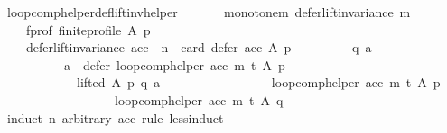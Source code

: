 \begin{isabellebody}
%
\isadelimproof
%
\endisadelimproof
%
\isadelimdocument
%
\endisadelimdocument
%
\isatagdocument
%
\isamarkuptrue%
%
\endisatagdocument
{\isafolddocument}%
%
\isadelimdocument
%
\endisadelimdocument
{}\isamarkupfalse%
\ loop{\isacharunderscore}{\kern0pt}comp{\isacharunderscore}{\kern0pt}helper{\isacharunderscore}{\kern0pt}def{\isacharunderscore}{\kern0pt}lift{\isacharunderscore}{\kern0pt}inv{\isacharunderscore}{\kern0pt}helper{\isacharcolon}{\kern0pt}\isanewline
\ \ \isanewline
\ \ \ \ monotone{\isacharunderscore}{\kern0pt}m{\isacharcolon}{\kern0pt}\ {\isachardoublequoteopen}defer{\isacharunderscore}{\kern0pt}lift{\isacharunderscore}{\kern0pt}invariance\ m{\isachardoublequoteclose}\ \isanewline
\ \ \ \ f{\isacharunderscore}{\kern0pt}prof{\isacharcolon}{\kern0pt}\ {\isachardoublequoteopen}finite{\isacharunderscore}{\kern0pt}profile\ A\ p{\isachardoublequoteclose}\isanewline
\ \ \isanewline
\ \ \ \ {\isachardoublequoteopen}{\isacharparenleft}{\kern0pt}defer{\isacharunderscore}{\kern0pt}lift{\isacharunderscore}{\kern0pt}invariance\ acc\ {\isasymand}\ n\ {\isacharequal}{\kern0pt}\ card\ {\isacharparenleft}{\kern0pt}defer\ acc\ A\ p{\isacharparenright}{\kern0pt}{\isacharparenright}{\kern0pt}\ {\isasymlongrightarrow}\isanewline
\ \ \ \ \ \ \ \ {\isacharparenleft}{\kern0pt}{\isasymforall}q\ a{\isachardot}{\kern0pt}\isanewline
\ \ \ \ \ \ \ \ \ \ {\isacharparenleft}{\kern0pt}a\ {\isasymin}\ {\isacharparenleft}{\kern0pt}defer\ {\isacharparenleft}{\kern0pt}loop{\isacharunderscore}{\kern0pt}comp{\isacharunderscore}{\kern0pt}helper\ acc\ m\ t{\isacharparenright}{\kern0pt}\ A\ p{\isacharparenright}{\kern0pt}\ {\isasymand}\isanewline
\ \ \ \ \ \ \ \ \ \ \ \ lifted\ A\ p\ q\ a{\isacharparenright}{\kern0pt}\ {\isasymlongrightarrow}\isanewline
\ \ \ \ \ \ \ \ \ \ \ \ \ \ \ \ {\isacharparenleft}{\kern0pt}loop{\isacharunderscore}{\kern0pt}comp{\isacharunderscore}{\kern0pt}helper\ acc\ m\ t{\isacharparenright}{\kern0pt}\ A\ p\ {\isacharequal}{\kern0pt}\isanewline
\ \ \ \ \ \ \ \ \ \ \ \ \ \ \ \ \ \ {\isacharparenleft}{\kern0pt}loop{\isacharunderscore}{\kern0pt}comp{\isacharunderscore}{\kern0pt}helper\ acc\ m\ t{\isacharparenright}{\kern0pt}\ A\ q{\isacharparenright}{\kern0pt}{\isachardoublequoteclose}\isanewline
%
\isadelimproof
%
\endisadelimproof
%
\isatagproof
{}\isamarkupfalse%
\ {\isacharparenleft}{\kern0pt}induct\ n\ arbitrary{\isacharcolon}{\kern0pt}\ acc\ rule{\isacharcolon}{\kern0pt}\ less{\isacharunderscore}{\kern0pt}induct{\isacharparenright}{\kern0pt}\isanewline

\end{isabellebody}
